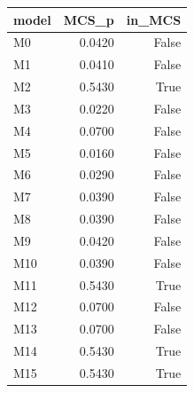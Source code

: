 \begin{tabular}{lrr}
\toprule
model & MCS_p & in_MCS \\
\midrule
M0 & 0.0420 & False \\
M1 & 0.0410 & False \\
M2 & 0.5430 & True \\
M3 & 0.0220 & False \\
M4 & 0.0700 & False \\
M5 & 0.0160 & False \\
M6 & 0.0290 & False \\
M7 & 0.0390 & False \\
M8 & 0.0390 & False \\
M9 & 0.0420 & False \\
M10 & 0.0390 & False \\
M11 & 0.5430 & True \\
M12 & 0.0700 & False \\
M13 & 0.0700 & False \\
M14 & 0.5430 & True \\
M15 & 0.5430 & True \\
\bottomrule
\end{tabular}
